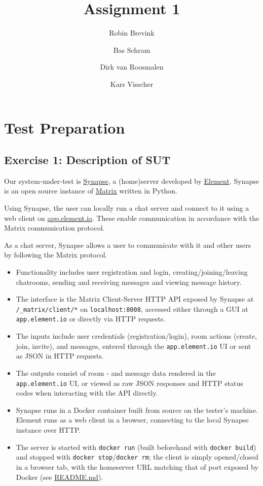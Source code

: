 \documentclass[a4paper]{article}
\begin{document}
	\title{Assignment 1}	
	\author{Robin Brevink \and Bas Schram \and Dirk van Roosmalen \and Kars Visscher}
	\maketitle
	
	\section{Test Preparation} \label{test-preparation}
	\subsection{Exercise 1: Description of SUT} \label{exercise-1-description-of-sut}
	Our system-under-test is \href{https://github.com/element-hq/synapse}{Synapse}, a (home)server developed by \href{https://element.io/}{Element}. Synapse is an open source instance of \href{https://matrix.org/}{Matrix} written in Python.
	
	Using Synapse, the user can locally run a chat server and connect to it using a web client on \href{https://app.element.io/}{app.element.io}. These enable communication in accordance with the Matrix communication protocol.
	
	As a chat server, Synapse allows a user to communicate with it and other users by following the Matrix protocol.
	\begin{itemize}
		\item Functionality includes user registration and login, creating/joining/leaving chatrooms, sending and receiving messages and viewing message history.
		\item The interface is the Matrix Client-Server HTTP API exposed by Synapse at \texttt{/\_matrix/client/*} on \texttt{localhost:8008}, accessed either through a GUI at \texttt{app.element.io} or directly via HTTP requests.
		\item The inputs include user credentials (registration/login), room actions (create, join, invite), and messages, entered through the \texttt{app.element.io} UI or sent as JSON in HTTP requests.
		\item The outputs consist of room - and message data rendered in the \texttt{app.element.io} UI, or viewed as raw JSON responses and HTTP status codes when interacting with the API directly.
		\item Synapse runs in a Docker container built from source on the tester's machine. Element runs as a web client in a browser, connecting to the local Synapse instance over HTTP.
		\item The server is started with \texttt{docker run} (built beforehand with \texttt{docker build}) and stopped with \texttt{docker stop}/\texttt{docker rm}; the client is simply opened/closed in a browser tab, with the homeserver URL matching that of port exposed by Docker (see \href{https://github.com/kjvisscher/TestingTechniques1/blob/main/README.md}{README.md}).
	\end{itemize}
	
\end{document}
